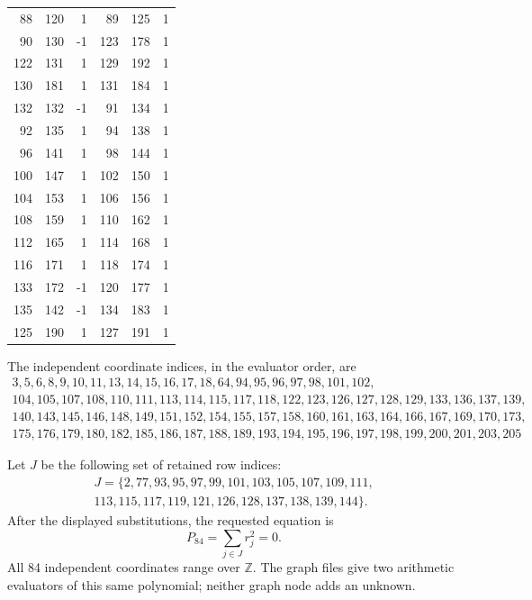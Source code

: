 \begin{longtable}{rrr@{\qquad}rrr}
88&120&1&89&125&1\\

90&130&-1&123&178&1\\

122&131&1&129&192&1\\

130&181&1&131&184&1\\

132&132&-1&91&134&1\\

92&135&1&94&138&1\\

96&141&1&98&144&1\\

100&147&1&102&150&1\\

104&153&1&106&156&1\\

108&159&1&110&162&1\\

112&165&1&114&168&1\\

116&171&1&118&174&1\\

133&172&-1&120&177&1\\

135&142&-1&134&183&1\\

125&190&1&127&191&1\\

\bottomrule\end{longtable}

The independent coordinate indices, in the evaluator order, are
\begin{gather*}
3, 5, 6, 8, 9, 10, 11, 13, 14, 15, 16, 17, 18, 64, 94, 95, 96, 97, 98, 101, 102,\\
104, 105, 107, 108, 110, 111, 113, 114, 115, 117, 118, 122, 123, 126, 127, 128, 129, 133, 136, 137, 139,\\
140, 143, 145, 146, 148, 149, 151, 152, 154, 155, 157, 158, 160, 161, 163, 164, 166, 167, 169, 170, 173,\\
175, 176, 179, 180, 182, 185, 186, 187, 188, 189, 193, 194, 195, 196, 197, 198, 199, 200, 201, 203, 205
\end{gather*}


Let $J$ be the following set of retained row indices:
\begin{gather*}
J=\{2,77,93,95,97,99,101,103,105,107,109,111,\\
113,115,117,119,121,126,128,137,138,139,144\}.
\end{gather*}
After the displayed substitutions, the requested equation is
\[ P_{84}=\sum_{j\in J}r_j^2=0.\]
All 84 independent coordinates range over $\mathbb Z$. The graph files give two arithmetic evaluators of this same polynomial; neither graph node adds an unknown.

